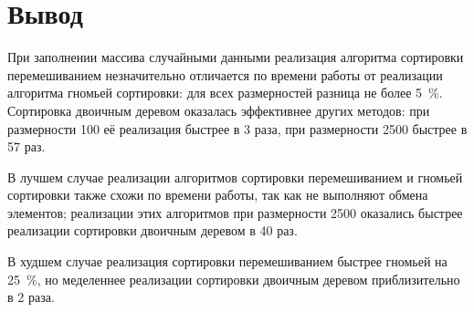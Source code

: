 \section*{Вывод} 
При заполнении массива случайными данными реализация алгоритма сортировки перемешиванием незначительно отличается по времени работы от реализации алгоритма гномьей сортировки: для всех размерностей разница не более 5~\%. Сортировка двоичным деревом  оказалась эффективнее других методов: при размерности 100 её реализация быстрее в 3 раза, при размерности 2500 быстрее в 57 раз.

В лучшем случае реализации алгоритмов сортировки перемешиванием и гномьей сортировки также схожи по времени работы, так как не выполняют обмена элементов; реализации этих алгоритмов при размерности 2500 оказались быстрее реализации сортировки двоичным деревом в 40 раз.

В худшем случае реализация сортировки перемешиванием быстрее гномьей на 25~\%, но меделеннее реализации сортировки двоичным деревом приблизительно в 2 раза.

